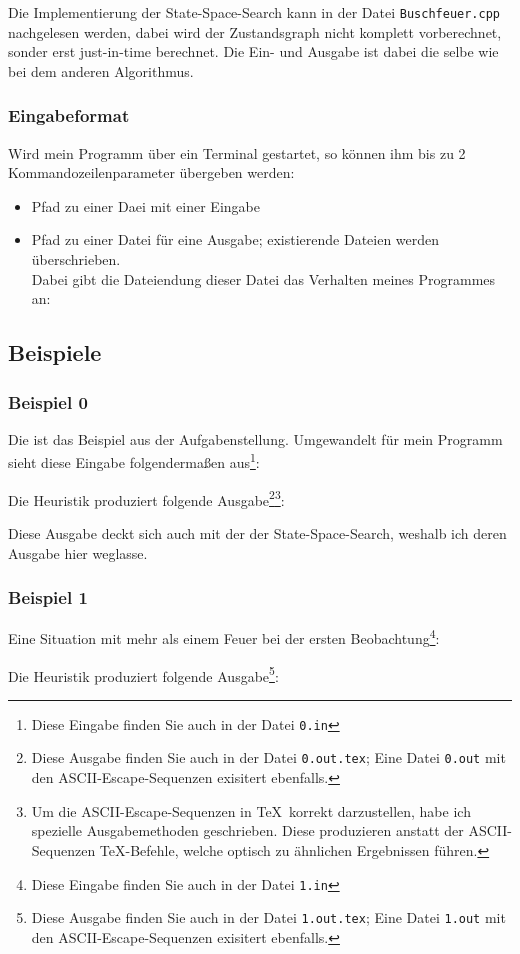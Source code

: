 Die Implementierung der State-Space-Search kann in der Datei \texttt{Buschfeuer.cpp} nachgelesen werden, dabei wird der Zustandsgraph nicht komplett vorberechnet, sonder erst just-in-time berechnet. Die Ein- und Ausgabe ist dabei die selbe wie bei dem anderen Algorithmus.

\subsubsection{Eingabeformat}
Wird mein Programm über ein Terminal gestartet, so können ihm bis zu 2 Kommandozeilenparameter übergeben werden:
\begin{itemize}
\item[Arg. 1] Pfad zu einer Daei mit einer Eingabe
\item[Arg. 2] Pfad zu einer Datei für eine Ausgabe; existierende Dateien werden überschrieben.\\
Dabei gibt die Dateiendung dieser Datei das Verhalten meines Programmes an:
\end{itemize}
\newpage
\subsection{Beispiele}
\subsubsection{Beispiel 0}
Die ist das Beispiel aus der Aufgabenstellung. Umgewandelt für mein Programm sieht diese Eingabe folgendermaßen aus\footnote{Diese Eingabe finden Sie auch in der Datei \texttt{0.in}}:
{\small

}
Die Heuristik produziert folgende Ausgabe\footnote{Diese Ausgabe finden Sie auch in der Datei \texttt{0.out.tex}; Eine Datei \texttt{0.out} mit den ASCII-Escape-Sequenzen exisitert ebenfalls.}\footnote{Um die ASCII-Escape-Sequenzen in \TeX\, korrekt darzustellen, habe ich spezielle Ausgabemethoden geschrieben. Diese produzieren anstatt der ASCII-Sequenzen \TeX -Befehle, welche optisch zu ähnlichen Ergebnissen führen.}:\\
{\ttfamily \small

}

Diese Ausgabe deckt sich auch mit der der State-Space-Search, weshalb ich deren Ausgabe hier weglasse.

\subsubsection{Beispiel 1}
Eine Situation mit mehr als einem Feuer bei der ersten Beobachtung\footnote{Diese Eingabe finden Sie auch in der Datei \texttt{1.in}}:
{\small

}
Die Heuristik produziert folgende Ausgabe\footnote{Diese Ausgabe finden Sie auch in der Datei \texttt{1.out.tex}; Eine Datei \texttt{1.out} mit den ASCII-Escape-Sequenzen exisitert ebenfalls.}:\\
{\ttfamily \small

}
